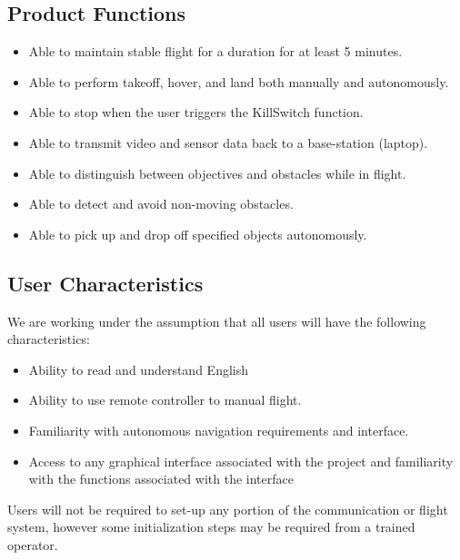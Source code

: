 \documentclass[letterpaper, 10, draftclsnofoot, onecolumn]{IEEEtran}
\begin{document}
\subsection{Product Functions}
\begin{itemize} 

\item Able to maintain stable flight for a duration for at least 5 minutes.

\item Able to perform takeoff, hover, and land both manually and autonomously.

\item Able to stop when the user triggers the KillSwitch function.
 
\item Able to transmit video and sensor data back to a base-station (laptop).
 
\item Able to distinguish between objectives and obstacles while in flight. 

\item Able to detect and avoid non-moving obstacles.

\item Able to pick up and drop off specified objects autonomously.
\end{itemize}



\subsection{User Characteristics}

We are working under the assumption that all users will have the following characteristics:
\begin{itemize}
    \item Ability to read and understand English
    \item Ability to use remote controller to manual flight. 
    \item Familiarity with autonomous navigation requirements and interface.
    \item Access to any graphical interface associated with the project and familiarity with the functions associated with the interface
\end{itemize}

Users will not be required to set-up any portion of the communication or flight system, however some initialization steps may be required from a trained operator. 
\end{document}
